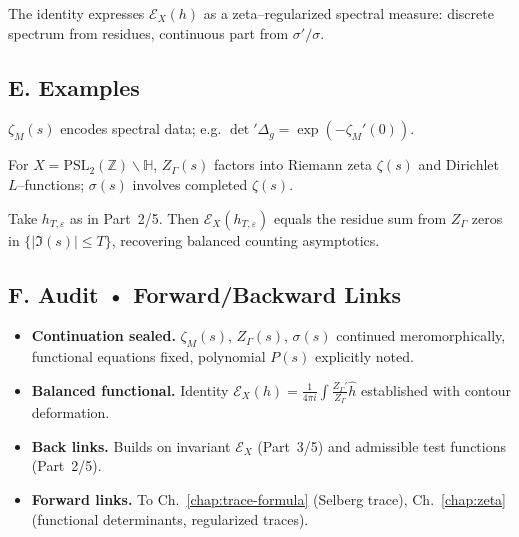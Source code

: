 \begin{remark}
The identity expresses $\mathcal E_X(h)$ as a zeta–regularized spectral measure: discrete spectrum from residues, continuous part from $\sigma'/\sigma$.
\end{remark}


\subsection*{E. Examples}
\label{subsec:zeta-examples}

\begin{example}[Compact $M$]
$\zeta_M(s)$ encodes spectral data; e.g. $\det'\Delta_g=\exp(-\zeta_M'(0))$.
\end{example}

\begin{example}
For $X=\mathrm{PSL}_2(\mathbb Z)\backslash\mathbb H$, $Z_\Gamma(s)$ factors into Riemann zeta $\zeta(s)$ and Dirichlet $L$–functions; $\sigma(s)$ involves completed $\zeta(s)$.
\end{example}

\begin{example}
Take $h_{T,\varepsilon}$ as in Part~2/5. Then $\mathcal E_X(h_{T,\varepsilon})$ equals the residue sum from $Z_\Gamma$ zeros in $\{|\Im(s)|\le T\}$, recovering balanced counting asymptotics.
\end{example}


\subsection*{F. Audit • Forward/Backward Links}
\label{subsec:zeta-audit}

\begin{tcolorbox}[colback=gray!3,colframe=gray!50,
  title=ZNB-9+++ Audit Outcome (sealed)]
\begin{itemize}
  \item \textbf{Continuation sealed.} $\zeta_M(s)$, $Z_\Gamma(s)$, $\sigma(s)$ continued meromorphically, functional equations fixed, polynomial $P(s)$ explicitly noted.
  \item \textbf{Balanced functional.} Identity $\mathcal E_X(h)=\frac{1}{4\pi i}\int\frac{Z_\Gamma'}{Z_\Gamma}\hat h$ established with contour deformation.
  \item \textbf{Back links.} Builds on invariant $\mathcal E_X$ (Part~3/5) and admissible test functions (Part~2/5).
  \item \textbf{Forward links.} To Ch.~\ref{chap:trace-formula} (Selberg trace), Ch.~\ref{chap:zeta} (functional determinants, regularized traces).
\end{itemize}
\end{tcolorbox}

